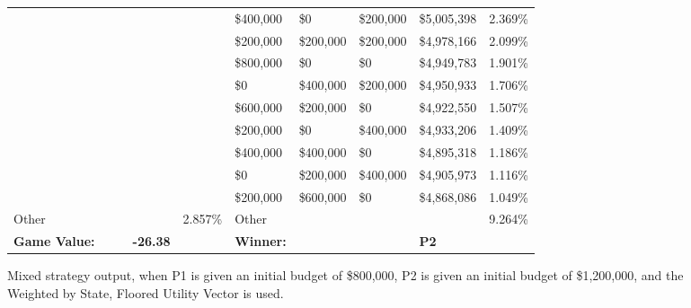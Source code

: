 \documentclass[11pt]{article}
\begin{document}
\begin{figure}
\begin{tabular}{ |p{1.0cm}p{1.0cm}p{1.0cm}p{2.0cm}|p{1.0cm}||p{1.0cm}p{1.0cm}p{1.0cm}p{2.0cm}|p{1.0cm}|}
&&&&                                                & \$400,000 & \$0& \$200,000 & \$5,005,398  & 2.369\% \\
&&&&                                                & \$200,000& \$200,000& \$200,000 & \$4,978,166  & 2.099\% \\
&&&&                                                & \$800,000 & \$0 & \$0 & \$4,949,783  & 1.901\% \\
&&&&                                                & \$0& \$400,000& \$200,000 & \$4,950,933  & 1.706\% \\
&&&&                                                & \$600,000& \$200,000 & \$0 & \$4,922,550  & 1.507\% \\
&&&&                                                & \$200,000 & \$0& \$400,000 & \$4,933,206  & 1.409\% \\
&&&&                                                & \$400,000& \$400,000 & \$0 & \$4,895,318  & 1.186\% \\
&&&&                                                & \$0& \$200,000& \$400,000 & \$4,905,973  & 1.116\% \\
&&&&                                                & \$200,000 & \$600,000 & \$0 & \$4,868,086  & 1.049\% \\
\hline
Other &&&& 2.857\% & Other &&&& 9.264\% \\
\hline
\small \textbf{Game Value:} &&& \small \textbf{-26.38} && \small \textbf{Winner:} &&& \small \textbf{P2}&\\
\hline
\end{tabular}
\caption{Mixed strategy output, when P1 is given an initial budget of \$800,000, P2 is given an initial budget of \$1,200,000, and the Weighted by State, Floored Utility Vector is used.}
\label{8v12table.2}
\end{figure}
\end{document}
